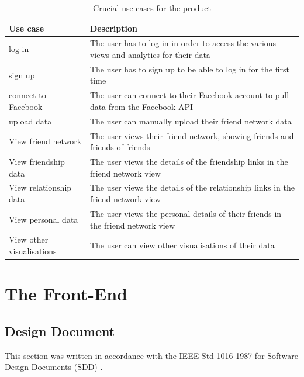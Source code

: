 \documentclass[12pt,onecolumn]{article}
\begin{document}
	\begin{table} [htbp]
		\caption{Crucial use cases for the product}
		\label{usecase}
		\centering
		\begin{tabular}{p{}|p{}}
			\hline
			\textbf{Use case} & \textbf{Description} \\ \hline
			log in & The user has to log in in order to access the various views and analytics for their data \\
			sign up & The user has to sign up to be able to log in for the first time \\
			connect to Facebook & The user can connect to their Facebook account to pull data from the Facebook API \\
			upload data & The user can manually upload their friend network data \\
			View friend network & The user views their friend network, showing friends and friends of friends \\
			View friendship data & The user views the details of the friendship links in the friend network view \\
			View relationship data & The user views the details of the relationship links in the friend network view \\
			View personal data & The user views the personal details of their friends in the friend network view \\
			View other visualisations & The user can view other visualisations of their data \\ \hline
		\end{tabular}
	\end{table}
	
	
	
	\section{The Front-End}	
	
	\subsection{Design Document} %
	This section was written in accordance with the IEEE Std 1016-1987 for Software Design Documents (SDD) \cite{IEEE}. 
	
\end{document}
